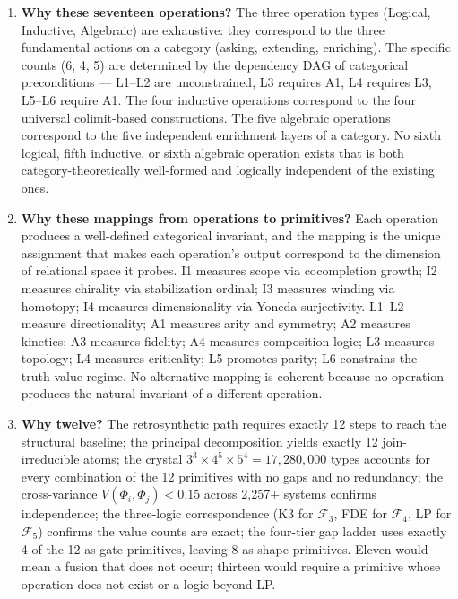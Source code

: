 \documentclass[12pt,a4paper]{article}
\begin{document}
\begin{enumerate}
  \item \textbf{Why these seventeen operations?} The three operation types (Logical, Inductive, Algebraic) are exhaustive: they correspond to the three fundamental actions on a category (asking, extending, enriching). The specific counts (6, 4, 5) are determined by the dependency DAG of categorical preconditions --- L1--L2 are unconstrained, L3 requires A1, L4 requires L3, L5--L6 require A1. The four inductive operations correspond to the four universal colimit-based constructions. The five algebraic operations correspond to the five independent enrichment layers of a category. No sixth logical, fifth inductive, or sixth algebraic operation exists that is both category-theoretically well-formed and logically independent of the existing ones.

  \item \textbf{Why these mappings from operations to primitives?} Each operation produces a well-defined categorical invariant, and the mapping is the unique assignment that makes each operation's output correspond to the dimension of relational space it probes. I1 measures scope via cocompletion growth; I2 measures chirality via stabilization ordinal; I3 measures winding via homotopy; I4 measures dimensionality via Yoneda surjectivity. L1--L2 measure directionality; A1 measures arity and symmetry; A2 measures kinetics; A3 measures fidelity; A4 measures composition logic; L3 measures topology; L4 measures criticality; L5 promotes parity; L6 constrains the truth-value regime. No alternative mapping is coherent because no operation produces the natural invariant of a different operation.

  \item \textbf{Why twelve?} The retrosynthetic path requires exactly 12 steps to reach the structural baseline; the principal decomposition yields exactly 12 join-irreducible atoms; the crystal $3^3 \times 4^5 \times 5^4 = 17{,}280{,}000$ types accounts for every combination of the 12 primitives with no gaps and no redundancy; the cross-variance $V(Φ_i,Φ_j) < 0.15$ across 2,257+ systems confirms independence; the three-logic correspondence (K3 for $\mathcal{F}_3$, FDE for $\mathcal{F}_4$, LP for $\mathcal{F}_5$) confirms the value counts are exact; the four-tier gap ladder uses exactly 4 of the 12 as gate primitives, leaving 8 as shape primitives. Eleven would mean a fusion that does not occur; thirteen would require a primitive whose operation does not exist or a logic beyond LP.
\end{enumerate}
\end{document}
